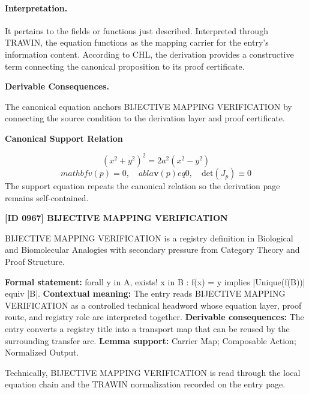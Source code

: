 \paragraph{Interpretation.}
It pertains to the fields or functions just described. Interpreted through TRAWIN, the equation functions as the mapping carrier for the entry’s information content. According to CHL, the derivation provides a constructive term connecting the canonical proposition to its proof certificate.

\par\vspace{0.35em}
\noindent\textbf{Derivable Consequences.}\quad
\begingroup
\footnotesize
\raggedright
The canonical equation anchors BIJECTIVE MAPPING VERIFICATION by connecting the source condition to the derivation layer and proof certificate.
\par\endgroup

\noindent\textbf{Canonical Support Relation}\par
\[
(x^2 + y^2)^2 = 2a^2(x^2 - y^2)
\]
\[
mathbf{v}(p) = 0, \quad  abla \mathbf{v}(p)  eq 0, \quad \text{det}(J_p) \equiv 0
\]
\noindent The support equation repeats the canonical relation so the derivation page remains self-contained.\par

\clearpage
\noindent\textbf{[ID 0967] BIJECTIVE MAPPING VERIFICATION}\par
\vspace{0.35em}
\begingroup\small
{}
BIJECTIVE MAPPING VERIFICATION is a registry definition in Biological and Biomolecular Analogies with secondary pressure from Category Theory and Proof Structure.

\begingroup\footnotesize\setlength{\emergencystretch}{3em}\sloppy
\textbf{Formal statement:} forall y in A, exists! x in B : f(x) = y implies |Unique(f(B))| equiv |B|. \textbf{Contextual meaning:} The entry reads BIJECTIVE MAPPING VERIFICATION as a controlled technical headword whose equation layer, proof route, and registry role are interpreted together. \textbf{Derivable consequences:} The entry converts a registry title into a transport map that can be reused by the surrounding transfer arc. \textbf{Lemma support:} Carrier Map; Composable Action; Normalized Output.\par
\endgroup

Technically, BIJECTIVE MAPPING VERIFICATION is read through the local equation chain and the TRAWIN normalization recorded on the entry page.

